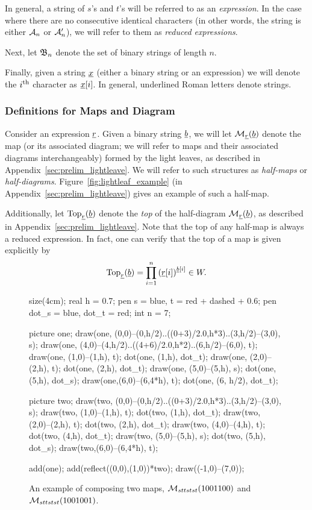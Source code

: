 In general, a string of $s$'s and $t$'s will be referred to as an \emph{expression}.  In the case where there are no consecutive identical characters (in other words, the string is either $\AA_n$ or $\AA_n'$), we will refer to them as \emph{reduced expressions}.

Next, let $\BB_n$ denote the set of binary strings of length $n$.

Finally, given a string $\ul x$ (either a binary string or an expression) we will denote the $i\th$ character as $\ul x[i]$.  In general, underlined Roman letters denote strings.

\subsubsection{Definitions for Maps and Diagram}
Consider an expression $\ul r$.  Given a binary string $\ul b$, we will let $\MM_{\ul r}(\ul b)$ denote the map (or its associated diagram; we will refer to maps and their associated diagrams interchangeably) formed by the light leaves, as described in Appendix~\ref{sec:prelim_lightleave}.  We will refer to such structures as \emph{half-maps} or \emph{half-diagrams}.  Figure~\ref{fig:lightleaf_example} (in Appendix~\ref{sec:prelim_lightleave}) gives an example of such a half-map.

Additionally, let $\Top_{\ul r}(\ul b)$ denote the \emph{top} of the half-diagram $\MM_{\ul r}(\ul b)$, as described in Appendix~\ref{sec:prelim_lightleave}.  
Note that the top of any half-map is always a reduced expression.  In fact, one can verify that the top of a map is given explicitly by
\begin{equation}
	\Top_{\ul r}(\ul b) = \prod_{i=1}^n \left( \ul r[i] \right)^{\ul b[i]} \in W.
	\label{eq:top}
\end{equation}

\begin{figure}[ht]
	\centering
	\begin{asy}
	size(4cm);
	real h = 0.7;
	pen s = blue, t = red + dashed + 0.6;
	pen dot_s = blue, dot_t = red;
	int n = 7;

	picture one;
	draw(one, (0,0)--(0,h/2)..((0+3)/2.0,h*3)..(3,h/2)--(3,0), s);
	draw(one, (4,0)--(4,h/2)..((4+6)/2.0,h*2)..(6,h/2)--(6,0), t);
	draw(one, (1,0)--(1,h), t);
	dot(one, (1,h), dot_t);
	draw(one, (2,0)--(2,h), t);
	dot(one, (2,h), dot_t);
	draw(one, (5,0)--(5,h), s);
	dot(one, (5,h), dot_s);
	draw(one,(6,0)--(6,4*h), t);
	dot(one, (6, h/2), dot_t);

	picture two;
	draw(two, (0,0)--(0,h/2)..((0+3)/2.0,h*3)..(3,h/2)--(3,0), s);
	draw(two, (1,0)--(1,h), t);
	dot(two, (1,h), dot_t);
	draw(two, (2,0)--(2,h), t);
	dot(two, (2,h), dot_t);
	draw(two, (4,0)--(4,h), t);
	dot(two, (4,h), dot_t);
	draw(two, (5,0)--(5,h), s);
	dot(two, (5,h), dot_s);
	draw(two,(6,0)--(6,4*h), t);

	add(one); add(reflect((0,0),(1,0))*two);
	draw((-1,0)--(7,0));
	\end{asy}
	\caption{An example of composing two maps, $\MM_{sttstst}(1001100)$ and $\MM_{sttstst}(1001001)$.}
	\label{fig:example_compose}
\end{figure}

